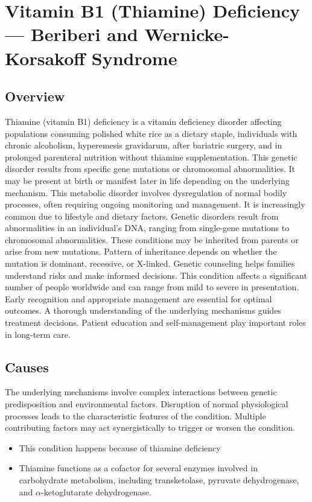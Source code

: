 \chapter{Vitamin B1 (Thiamine) Deficiency --- Beriberi and Wernicke-Korsakoff Syndrome}
\label{sec:Vitamin B1 Deficiency}

\section{Overview}
Thiamine (vitamin B1) deficiency is a vitamin deficiency disorder affecting populations consuming polished white rice as a dietary staple, individuals with chronic alcoholism, hyperemesis gravidarum, after bariatric surgery, and in prolonged parenteral nutrition without thiamine supplementation. This genetic disorder results from specific gene mutations or chromosomal abnormalities. It may be present at birth or manifest later in life depending on the underlying mechanism. This metabolic disorder involves dysregulation of normal bodily processes, often requiring ongoing monitoring and management. It is increasingly common due to lifestyle and dietary factors. Genetic disorders result from abnormalities in an individual's DNA, ranging from single-gene mutations to chromosomal abnormalities. These conditions may be inherited from parents or arise from new mutations. Pattern of inheritance depends on whether the mutation is dominant, recessive, or X-linked. Genetic counseling helps families understand risks and make informed decisions. This condition affects a significant number of people worldwide and can range from mild to severe in presentation. Early recognition and appropriate management are essential for optimal outcomes. A thorough understanding of the underlying mechanisms guides treatment decisions. Patient education and self-management play important roles in long-term care.
\section{Causes}
The underlying mechanisms involve complex interactions between genetic predisposition and environmental factors. Disruption of normal physiological processes leads to the characteristic features of the condition. Multiple contributing factors may act synergistically to trigger or worsen the condition.

\begin{itemize}[noitemsep]
  \item This condition happens because of thiamine deficiency
  \item Thiamine functions as a cofactor for several enzymes involved in carbohydrate metabolism, including transketolase, pyruvate dehydrogenase, and $\alpha$-ketoglutarate dehydrogenase.
\end{itemize}
